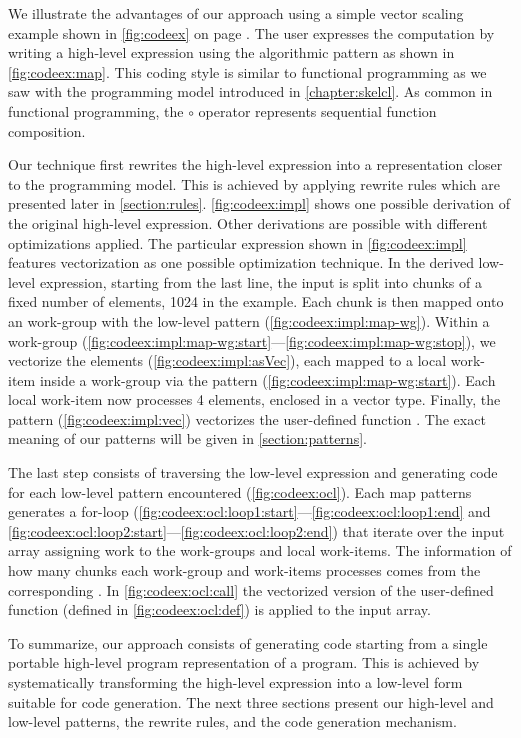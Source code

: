 We illustrate the advantages of our approach using a simple vector scaling example shown in \autoref{fig:codeex} on page \pageref{fig:codeex}.
The user expresses the computation by writing a high-level expression using the algorithmic  pattern as shown in \autoref{fig:codeex:map}.
This coding style is similar to functional programming as we saw with the \SkelCL programming model introduced in \autoref{chapter:skelcl}.
As common in functional programming, the $\circ$ operator represents sequential function composition. %

Our technique first rewrites the high-level expression into a representation closer to the \OpenCL programming model.
This is achieved by applying rewrite rules which are presented later in \autoref{section:rules}.
\autoref{fig:codeex:impl} shows one possible derivation of the original high-level expression.
Other derivations are possible with different optimizations applied.
The particular expression shown in \autoref{fig:codeex:impl} features vectorization as one possible optimization technique.
In the derived low-level expression, starting from the last line, the input is split into chunks of a fixed number of elements, 1024 in the example.
Each chunk is then mapped onto an \OpenCL work-group with the  low-level pattern (\autoref{fig:codeex:impl:map-wg}).
Within a work-group (\autoref{fig:codeex:impl:map-wg:start}---\autoref{fig:codeex:impl:map-wg:stop}), we vectorize the elements (\autoref{fig:codeex:impl:asVec}), each mapped to a local work-item inside a work-group via the  pattern (\autoref{fig:codeex:impl:map-wg:start}).
Each local work-item now processes 4 elements, enclosed in a vector type.
Finally, the  pattern (\autoref{fig:codeex:impl:vec}) vectorizes the user-defined function .
The exact meaning of our patterns will be given in \autoref{section:patterns}.

The last step consists of traversing the low-level expression and generating \OpenCL code for each low-level pattern encountered (\autoref{fig:codeex:ocl}).
Each map patterns generates a for-loop (\autoref{fig:codeex:ocl:loop1:start}---\autoref{fig:codeex:ocl:loop1:end} and \autoref{fig:codeex:ocl:loop2:start}---\autoref{fig:codeex:ocl:loop2:end}) that iterate over the input array assigning work to the work-groups and local work-items.
The information of how many chunks each work-group and work-items processes comes from the corresponding .
In \autoref{fig:codeex:ocl:call} the vectorized version of the user-defined  function (defined in \autoref{fig:codeex:ocl:def}) is applied to the input array.

To summarize, our approach consists of generating \OpenCL code starting from a single portable high-level program representation of a program.
This is achieved by systematically transforming the high-level expression into a low-level form suitable for code generation.
The next three sections present our high-level and low-level patterns, the rewrite rules, and the code generation mechanism.

